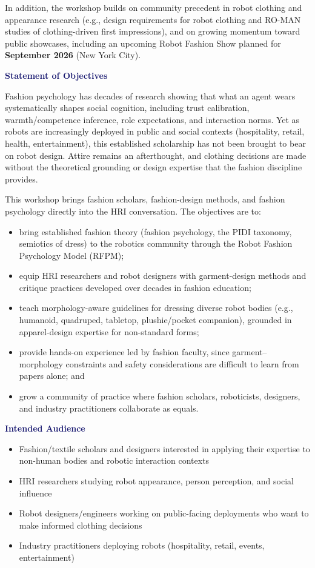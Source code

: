 \documentclass[12pt,letterpaper]{article}
\newcommand{\FormSection}[1]{\par\vspace{0.75\baselineskip}\noindent{\color{MidnightBlue}\rule{\textwidth}{0.4pt}}\par\vspace{2pt}\noindent\textbf{\textcolor{MidnightBlue}{#1}}\par}
\newcommand{\FormBlockSep}{\par\vspace{0.5\baselineskip}}
\begin{document}
\FormBlockSep
In addition, the workshop builds on community precedent in robot clothing and appearance research (e.g., design requirements for robot clothing and RO-MAN studies of clothing-driven first impressions), and on growing momentum toward public showcases, including an upcoming Robot Fashion Show planned for \textbf{September 2026} (New York City).

\FormSection{Statement of Objectives}
Fashion psychology has decades of research showing that what an agent wears systematically shapes social cognition, including trust calibration, warmth/competence inference, role expectations, and interaction norms. Yet as robots are increasingly deployed in public and social contexts (hospitality, retail, health, entertainment), this established scholarship has not been brought to bear on robot design. Attire remains an afterthought, and clothing decisions are made without the theoretical grounding or design expertise that the fashion discipline provides.

This workshop brings fashion scholars, fashion-design methods, and fashion psychology directly into the HRI conversation. The objectives are to:
\begin{itemize}
  \item bring established fashion theory (fashion psychology, the PIDI taxonomy, semiotics of dress) to the robotics community through the Robot Fashion Psychology Model (RFPM);
  \item equip HRI researchers and robot designers with garment-design methods and critique practices developed over decades in fashion education;
  \item teach morphology-aware guidelines for dressing diverse robot bodies (e.g., humanoid, quadruped, tabletop, plushie/pocket companion), grounded in apparel-design expertise for non-standard forms;
  \item provide hands-on experience led by fashion faculty, since garment--morphology constraints and safety considerations are difficult to learn from papers alone; and
  \item grow a community of practice where fashion scholars, roboticists, designers, and industry practitioners collaborate as equals.
\end{itemize}

\FormSection{Intended Audience}
\begin{itemize}
  \item Fashion/textile scholars and designers interested in applying their expertise to non-human bodies and robotic interaction contexts
  \item HRI researchers studying robot appearance, person perception, and social influence
  \item Robot designers/engineers working on public-facing deployments who want to make informed clothing decisions
  \item Industry practitioners deploying robots (hospitality, retail, events, entertainment)
\end{itemize}
\end{document}
